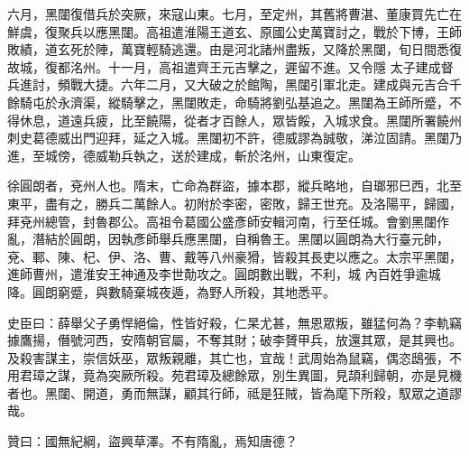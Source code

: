 \begin{pinyinscope}
 六月，黑闥復借兵於突厥，來寇山東。七月，至定州，其舊將曹湛、董康買先亡在鮮虞，復聚兵以應黑闥。高祖遣淮陽王道玄、原國公史萬寶討之，戰於下博，王師敗績，道玄死於陣，萬寶輕騎逃還。由是河北諸州盡叛，又降於黑闥，旬日間悉復故城，復都洺州。十一月，高祖遣齊王元吉擊之，遲留不進。又令隱
 太子建成督兵進討，頻戰大捷。六年二月，又大破之於館陶，黑闥引軍北走。建成與元吉合千餘騎屯於永濟渠，縱騎擊之，黑闥敗走，命騎將劉弘基追之。黑闥為王師所蹙，不得休息，道遠兵疲，比至饒陽，從者才百餘人，眾皆餒，入城求食。黑闥所署饒州刺史葛德威出門迎拜，延之入城。黑闥初不許，德威謬為誠敬，涕泣固請。黑闥乃進，至城傍，德威勒兵執之，送於建成，斬於洺州，山東復定。



 徐圓朗者，兗州人也。隋末，亡命為群盜，據本郡，縱兵略地，自瑯邪巳西，北至東平，盡有之，勝兵二萬餘人。初附於李密，密敗，歸王世充。及洛陽平，歸國，拜兗州總管，封魯郡公。高祖令葛國公盛彥師安輯河南，行至任城。會劉黑闥作亂，潛結於圓朗，因執彥師舉兵應黑闥，自稱魯王。黑闥以圓朗為大行臺元帥，兗、鄆、陳、杞、伊、洛、曹、戴等八州豪猾，皆殺其長吏以應之。太宗平黑闥，進師曹州，遣淮安王神通及李世勣攻之。圓朗數出戰，不利，城
 內百姓爭逾城降。圓朗窮蹙，與數騎棄城夜遁，為野人所殺，其地悉平。



 史臣曰：薛舉父子勇悍絕倫，性皆好殺，仁杲尤甚，無恩眾叛，雖猛何為？李軌竊據鷹揚，僭號河西，安隋朝官屬，不奪其財；破李贇甲兵，放還其眾，是其興也。及殺害謀主，崇信妖巫，眾叛親離，其亡也，宜哉！武周始為鼠竊，偶恣鴟張，不用君璋之謀，竟為突厥所殺。苑君璋及總餘眾，別生異圖，見頡利歸朝，亦是見機者也。黑闥、開道，勇而無謀，顧其行師，祗是狂賊，皆為麾下所殺，馭眾之道謬哉。



 贊曰：國無紀綱，盜興草澤。不有隋亂，焉知唐德？



\end{pinyinscope}